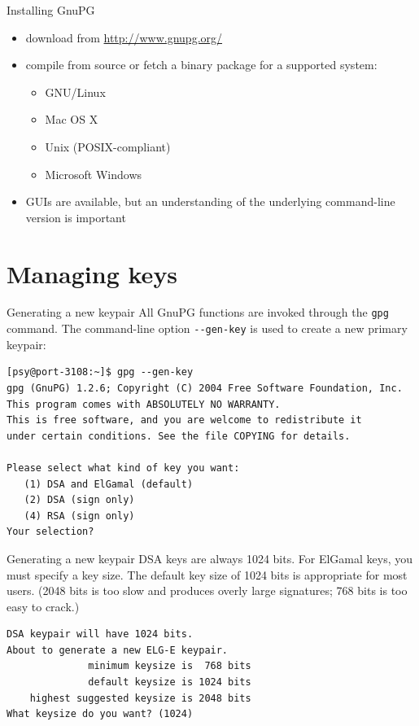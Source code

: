 \documentclass[%
mode=present,%
paper=smartboard,
size=20pt,
]{powerdot}
\newcommand{\clopt}[1]{\texttt{{-}#1}}
\begin{document}
\begin{slide}{Installing GnuPG}
  \begin{itemize}
  \item download from \url{http://www.gnupg.org/}
  \item compile from source or fetch a binary package for a supported
    system:
    \begin{itemize}
    \item GNU/Linux
    \item Mac OS X
    \item Unix (POSIX-compliant)
    \item Microsoft Windows
    \end{itemize}
  \item GUIs are available, but an understanding of the underlying
    command-line version is important
  \end{itemize}
\end{slide}

\section{Managing keys}

\begin{slide}[method=direct]{Generating a new keypair}
  All GnuPG functions are invoked through the \texttt{gpg} command.
  The command-line option \clopt{-gen-key} is used to create a new
  primary keypair:\\[1ex]
\begin{verbatim}
[psy@port-3108:~]$ gpg --gen-key
gpg (GnuPG) 1.2.6; Copyright (C) 2004 Free Software Foundation, Inc.
This program comes with ABSOLUTELY NO WARRANTY.
This is free software, and you are welcome to redistribute it
under certain conditions. See the file COPYING for details.

Please select what kind of key you want:
   (1) DSA and ElGamal (default)
   (2) DSA (sign only)
   (4) RSA (sign only)
Your selection? 
\end{verbatim}
\end{slide}

\begin{slide}[method=direct,toc=]{Generating a new keypair}
  DSA keys are always 1024 bits.  For ElGamal keys, you must specify a
  key size.  The default key size of 1024 bits is appropriate for most
  users. (2048 bits is too slow and produces overly large
  signatures; 768 bits is too easy to crack.)\\[1ex]
\begin{verbatim}
DSA keypair will have 1024 bits.
About to generate a new ELG-E keypair.
              minimum keysize is  768 bits
              default keysize is 1024 bits
    highest suggested keysize is 2048 bits
What keysize do you want? (1024) 
\end{verbatim}
\end{slide}
\end{document}
